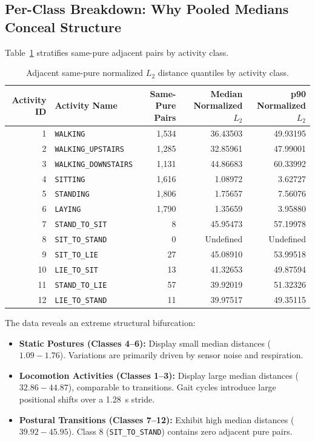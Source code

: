 \documentclass[11pt,a4paper]{article}
\newcommand{\code}[1]{{\small\ttfamily\nolinkurl{#1}}}
\theoremstyle{definition}
\begin{document}
\subsection{Per-Class Breakdown: Why Pooled Medians Conceal Structure}
Table~\ref{tab:class_distances} stratifies same-pure adjacent pairs by activity class.

\begin{table}[htbp]\centering\small
\begin{tabular}{rlrrr}\toprule
Activity ID & Activity Name & Same-Pure Pairs & Median Normalized $L_2$ & p90 Normalized $L_2$\\\midrule
1 & \code{WALKING} & 1,534 & 36.43503 & 49.93195\\
2 & \code{WALKING_UPSTAIRS} & 1,285 & 32.85961 & 47.99001\\
3 & \code{WALKING_DOWNSTAIRS} & 1,131 & 44.86683 & 60.33992\\
4 & \code{SITTING} & 1,616 & 1.08972 & 3.62727\\
5 & \code{STANDING} & 1,806 & 1.75657 & 7.56076\\
6 & \code{LAYING} & 1,790 & 1.35659 & 3.95880\\
7 & \code{STAND_TO_SIT} & 8 & 45.95473 & 57.19978\\
8 & \code{SIT_TO_STAND} & 0 & Undefined & Undefined\\
9 & \code{SIT_TO_LIE} & 27 & 45.08910 & 53.99518\\
10 & \code{LIE_TO_SIT} & 13 & 41.32653 & 49.87594\\
11 & \code{STAND_TO_LIE} & 57 & 39.92019 & 51.32326\\
12 & \code{LIE_TO_STAND} & 11 & 39.97517 & 49.35115\\\bottomrule
\end{tabular}
\caption{Adjacent same-pure normalized $L_2$ distance quantiles by activity class.}\label{tab:class_distances}
\end{table}

The data reveals an extreme structural bifurcation:
\begin{itemize}
\item \textbf{Static Postures (Classes 4--6):} Display small median distances ($1.09 - 1.76$). Variations are primarily driven by sensor noise and respiration.
\item \textbf{Locomotion Activities (Classes 1--3):} Display large median distances ($32.86 - 44.87$), comparable to transitions. Gait cycles introduce large positional shifts over a 1.28~s stride.
\item \textbf{Postural Transitions (Classes 7--12):} Exhibit high median distances ($39.92 - 45.95$). Class 8 (\code{SIT_TO_STAND}) contains zero adjacent pure pairs.
\end{itemize}
\end{document}
